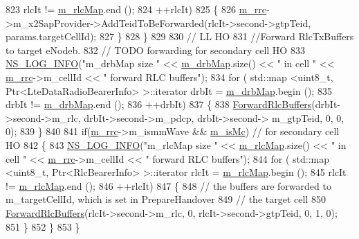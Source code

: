 \begin{DoxyCode}
823           rlcIt != \hyperlink{classns3_1_1UeManager_a64f37a901db7a322552ba08d87e65770}{m\_rlcMap}.end ();
824           ++rlcIt)
825     \{
826       \hyperlink{classns3_1_1UeManager_ab4405e9f354c66e7c1a4c95832290f5b}{m\_rrc}->m\_x2SapProvider->AddTeidToBeForwarded(rlcIt->second->gtpTeid, params.targetCellId);    
827     \}
828   \}
829 
830   \textcolor{comment}{// LL HO}
831   \textcolor{comment}{//Forward RlcTxBuffers to target eNodeb.}
832   \textcolor{comment}{// TODO forwarding for secondary cell HO}
833   \hyperlink{group__logging_gafbd73ee2cf9f26b319f49086d8e860fb}{NS\_LOG\_INFO}(\textcolor{stringliteral}{"m\_drbMap size "} << \hyperlink{classns3_1_1UeManager_a18499c025730b63c73e5d93effff57aa}{m\_drbMap}.size() << \textcolor{stringliteral}{" in cell "} << 
      \hyperlink{classns3_1_1UeManager_ab4405e9f354c66e7c1a4c95832290f5b}{m\_rrc}->m\_cellId << \textcolor{stringliteral}{" forward RLC buffers"});
834   \textcolor{keywordflow}{for} ( std::map <uint8\_t, Ptr<LteDataRadioBearerInfo> >::iterator drbIt = 
      \hyperlink{classns3_1_1UeManager_a18499c025730b63c73e5d93effff57aa}{m\_drbMap}.begin ();
835         drbIt != \hyperlink{classns3_1_1UeManager_a18499c025730b63c73e5d93effff57aa}{m\_drbMap}.end ();
836         ++drbIt)
837   \{
838     \hyperlink{classns3_1_1UeManager_acfe070a93481248c1d2624f02a448a34}{ForwardRlcBuffers}(drbIt->second->m\_rlc, drbIt->second->m\_pdcp, drbIt->second->
      m\_gtpTeid, 0, 0, 0);
839   \}
840 
841   \textcolor{keywordflow}{if}(\hyperlink{classns3_1_1UeManager_ab4405e9f354c66e7c1a4c95832290f5b}{m\_rrc}->m\_ismmWave && \hyperlink{classns3_1_1UeManager_a78958b4916253f7e2f9da8fd7f4662b6}{m\_isMc}) \textcolor{comment}{// for secondary cell HO}
842   \{
843     \hyperlink{group__logging_gafbd73ee2cf9f26b319f49086d8e860fb}{NS\_LOG\_INFO}(\textcolor{stringliteral}{"m\_rlcMap size "} << \hyperlink{classns3_1_1UeManager_a64f37a901db7a322552ba08d87e65770}{m\_rlcMap}.size() << \textcolor{stringliteral}{" in cell "} << 
      \hyperlink{classns3_1_1UeManager_ab4405e9f354c66e7c1a4c95832290f5b}{m\_rrc}->m\_cellId << \textcolor{stringliteral}{" forward RLC buffers"});
844     \textcolor{keywordflow}{for} ( std::map <uint8\_t, Ptr<RlcBearerInfo> >::iterator rlcIt = \hyperlink{classns3_1_1UeManager_a64f37a901db7a322552ba08d87e65770}{m\_rlcMap}.begin ();
845           rlcIt != \hyperlink{classns3_1_1UeManager_a64f37a901db7a322552ba08d87e65770}{m\_rlcMap}.end ();
846           ++rlcIt)
847     \{
848       \textcolor{comment}{// the buffers are forwarded to m\_targetCellId, which is set in PrepareHandover}
849       \textcolor{comment}{// the target cell}
850       \hyperlink{classns3_1_1UeManager_acfe070a93481248c1d2624f02a448a34}{ForwardRlcBuffers}(rlcIt->second->m\_rlc, 0, rlcIt->second->gtpTeid, 0, 1, 0);
851     \}
852   \}
853 \}
\end{DoxyCode}


